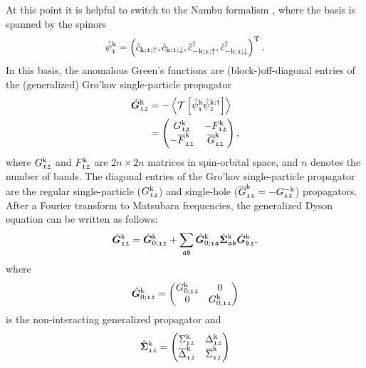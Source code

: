 \documentclass[../../main.tex]{subfiles}
\begin{document}
At this point it is helpful to switch to the Nambu formalism \cite{Nambu1950}, where the basis is spanned by the spinors
\begin{align}
	\hat\psi_{\mathfrak{1}}^{\text{k}}=\left (\hat{c}_{\text{k};\mathfrak{1};\uparrow}, \hat{c}_{\text{k};\mathfrak{1};\downarrow},\hat{c}^{\dagger}_{-\text{k};\mathfrak{1};\uparrow},\hat{c}^{\dagger}_{-\text{k};\mathfrak{1};\downarrow}\right )^{\text{T}}.
\end{align}
In this basis, the anomalous Green's functions are (block-)off-diagonal entries of the (generalized) Gro'kov single-particle propagator \cite{Yanase2003, Mineev1999}
\begin{align}
\begin{split}
	\hat{\bm G}_{\mathfrak{12}}^{\text{k}}&=-\left\langle \mathcal{T}\left [\hat{\psi}_{\mathfrak{1}}^{\text{k}}\hat{\psi}_{\mathfrak{2}}^{\text{k};\dagger}\right ]\right\rangle\\
	&=\begin{pmatrix}
		G_{\mathfrak{12}}^{\text{k}} & -F_{\mathfrak{12}}^{\text{k}}	\\
		-\overline{F}_{\mathfrak{12}}^{\text{k}} & \overline{G}_{\mathfrak{12}}^{\text{k}}
	\end{pmatrix},
\end{split}
\end{align}
where $G_{\mathfrak{12}}^{\text{k}}$ and $F_{\mathfrak{12}}^{\text{k}}$ are $2n \times 2n$ matrices in spin-orbital space, and $n$ denotes the number of bands. The diagonal entries of the Gro'kov single-particle propagator are the regular single-particle ($ G_{\mathfrak{12}}^{\text{k}}$) and single-hole ($\overline{G}_{\mathfrak{12}}^{\text{k}}=-G_{\mathfrak{12}}^{-\text{k}}$) propagators. After a Fourier transform to Matsubara frequencies, the generalized Dyson equation can be written as follows:
\begin{align}\label{eq:grokov_dyson}
	\hat{\bm G}_{\mathfrak{12}}^{\text{k}} = \hat{\bm G}_{0;\mathfrak{12}}^{\text{k}} + \sum_{\mathfrak{ab}}\hat{\bm G}_{0;\mathfrak{1a}}^{\text{k}}\hat{\bm\Sigma}_{\mathfrak{ab}}^{\text{k}}\hat{\bm G}_{\mathfrak{b2}}^{\text{k}},
\end{align}
where
\begin{align}
	\hat{\bm G}_{0;\mathfrak{12}}^{\text{k}}=\begin{pmatrix}
		G_{0;\mathfrak{12}}^{\text{k}} & 0 \\ 0 & G_{0;\mathfrak{12}}^{\text{k}}
	\end{pmatrix}
\end{align}
is the non-interacting generalized propagator and
\begin{align}
	\hat{\bm\Sigma}_{\mathfrak{12}}^{\text{k}}=\begin{pmatrix}
		\Sigma_{\mathfrak{12}}^{\text{k}} & \Delta_{\mathfrak{12}}^{\text{k}} \\ 
		\overline{\Delta}_{\mathfrak{12}}^{\text{k}} & \overline{\Sigma}_{\mathfrak{12}}^{\text{k}}
	\end{pmatrix}
\end{align}
\end{document}
